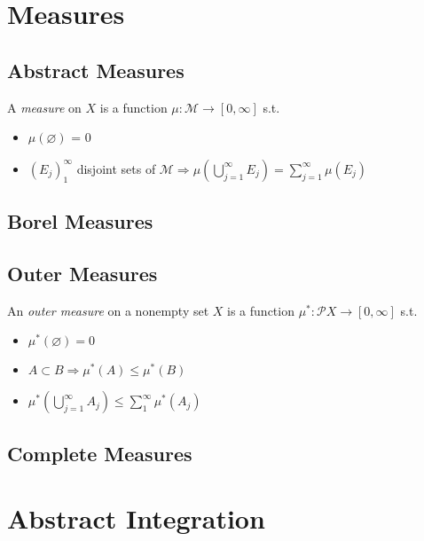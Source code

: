 \chapter{Measures}

\section{Abstract Measures}

\begin{definition}
    A \emph{measure} on \(X\) is a function \(\mu:\mathcal{M} \to [0,\infty]\) s.t.
    \begin{itemize}
        \item \(\mu(\varnothing)\) = 0
        \item \(\left( E_j \right)_{1}^{\infty} \) disjoint sets of  \(\mathcal{M} \Rightarrow \mu(\bigcup_{j=1}^{\infty} E_j) = \sum_{j=1}^{\infty} \mu(E_j) \)
    \end{itemize}
\end{definition}

\section{Borel Measures}

\section{Outer Measures}

\begin{definition}
    An \emph{outer measure} on a nonempty set \(X\) is a function \(\mu^\ast: \mathcal{P}X \to [0,\infty]\) s.t.
    \begin{itemize}
        \item \(\mu^\ast(\varnothing)=0\)
        \item \(A \subset B \Rightarrow \mu^\ast(A) \le \mu^\ast(B)\)
        \item \(\mu^\ast(\bigcup_{j=1}^{\infty} A_j) \le \sum_{1}^{\infty} \mu^\ast(A_j)\)
    \end{itemize}
\end{definition}

\section{Complete Measures}


\chapter{Abstract Integration}

